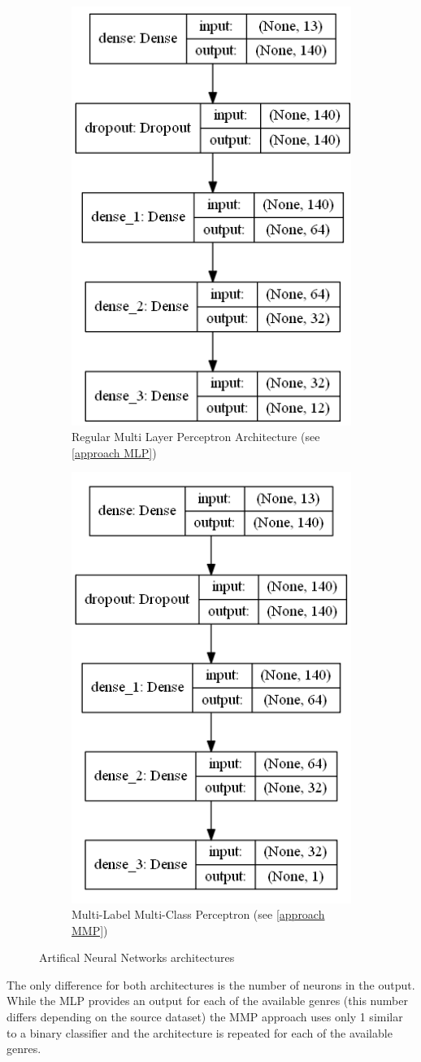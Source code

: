 \begin{figure}[!htb]
    \centering
    \begin{subfigure}{.5\textwidth}
        \centering
        \includegraphics[width=.4\linewidth]{Figures/mlp.png}
        \caption[MLP Architecture]{Regular Multi Layer Perceptron Architecture (see \ref{approach MLP})}
        \label{fig:annmlp}
    \end{subfigure}%
    \begin{subfigure}{.5\textwidth}
        \centering
        \includegraphics[width=.4\linewidth]{Figures/mmlp.png}
        \caption[MMP Architecture]{Multi-Label Multi-Class Perceptron  (see \ref{approach MMP})}
        \label{fig:annmmp}
    \end{subfigure}
    \caption{Artifical Neural Networks architectures}
    \label{fig:architectures}
\end{figure}

\FloatBarrier
The only difference for both architectures is the number of neurons in the output. 
While the MLP provides an output for each of the available genres (this number differs depending on the source dataset) 
the MMP approach uses only 1 similar to a binary classifier and the architecture is repeated for each of the available genres.

